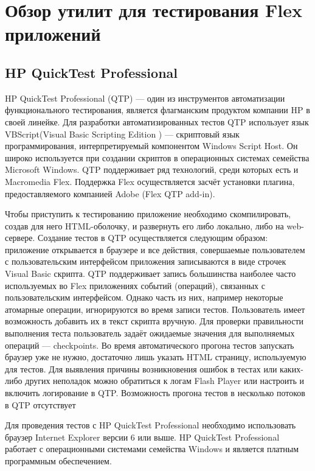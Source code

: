 \section{Обзор утилит для тестирования Flex приложений}

\subsection{HP QuickTest Professional}

HP QuickTest Professional (QTP) — один из инструментов автоматизации 
функционального тестирования, является флагманским продуктом компании 
HP в своей линейке. Для разработки автоматизированных тестов QTP 
использует язык VBScript(Visual Basic Scripting Edition ) — скриптовый 
язык программирования, интерпретируемый компонентом Windows Script Host.
Он широко используется при создании скриптов в операционных системах
семейства Microsoft Windows. QTP поддерживает ряд технологий, среди
которых есть и Macromedia Flex. Поддержка Flex осуществляется засчёт
установки плагина, предоставляемого компанией Adobe (Flex QTP add-in).

Чтобы приступить к тестированию приложение необходимо скомпилировать, 
создав для него HTML-оболочку, и развернуть его либо локально, либо на 
web-сервере. Создание тестов в QTP осуществляется следующим образом:
приложение открывается в браузере и все действия, совершаемые пользователем с 
пользовательским интерфейсом приложения записываются в виде строчек Visual Basic скрипта. 
QTP поддерживает запись большинства наиболее часто используемых во Flex 
приложениях событий (операций), связанных с пользовательским интерфейсом. 
Однако часть из них, например некоторые атомарные операции, игнорируются 
во время записи тестов. Пользователь имеет возможность добавить их в 
текст скрипта вручную. Для проверки правильности выполнения теста 
пользователь задаёт ожидаемые значения для выполняемых операций ---
checkpoints. Во время автоматического прогона тестов запускать браузер 
уже не нужно, достаточно лишь указать HTML страницу, используемую для 
тестов. Для выявления причины возникновения ошибок в тестах или каких-либо 
других неполадок можно обратиться к логам Flash Player или настроить и 
включить логирование в QTP. Возможность прогона тестов в несколько потоков
в QTP отсутствует

Для проведения тестов с HP QuickTest Professional необходимо использовать
 браузер Internet Explorer версии 6 или выше. HP QuickTest Professional 
работает с операционными системами семейства Windows и является платным 
программным обеспечением.

